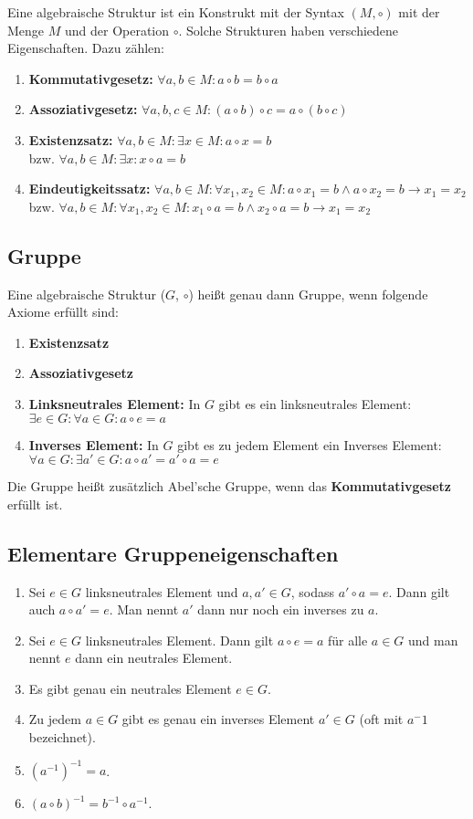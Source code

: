 Eine algebraische Struktur ist ein Konstrukt mit der Syntax $(M, \circ)$ mit der Menge $M$ und der Operation $\circ$.
Solche Strukturen haben verschiedene Eigenschaften.
Dazu zählen:
\begin{enumerate}
    \item \textbf{Kommutativgesetz:} $\forall a, b\in M:a\circ b=b\circ a$
    \item \textbf{Assoziativgesetz:} $\forall a, b, c\in M:(a\circ b)\circ c=a\circ (b\circ c)$
    \item \textbf{Existenzsatz:} $\forall a, b\in M: \exists x\in M: a\circ x=b$\\
    bzw. $\forall a, b\in M: \exists x: x\circ a=b$
    \item \textbf{Eindeutigkeitssatz:} $\forall a, b\in M:\forall x_1, x_2\in M : a\circ x_1 =b \wedge a\circ x_2=b\rightarrow x_1=x_2$\\
    bzw. $\forall a, b\in M:\forall x_1, x_2\in M : x_1\circ a =b \wedge x_2\circ a=b\rightarrow x_1=x_2$
\end{enumerate}
\subsection{Gruppe}
Eine algebraische Struktur ($G$, $\circ$) heißt genau dann Gruppe, wenn folgende Axiome erfüllt sind:
\begin{enumerate}
    \item \textbf{Existenzsatz}
    \item \textbf{Assoziativgesetz}
    \item \textbf{Linksneutrales Element:} In $G$ gibt es ein linksneutrales Element: $\exists e\in G: \forall a\in G: a\circ e = a$
    \item \textbf{Inverses Element:} In $G$ gibt es zu jedem Element ein Inverses Element: $\forall a\in G:\exists a'\in G: a\circ a'=a'\circ a=e$
\end{enumerate}
Die Gruppe heißt zusätzlich Abel'sche Gruppe, wenn das \textbf{Kommutativgesetz} erfüllt ist.
\subsection{Elementare Gruppeneigenschaften}\label{subsec:elementare-gruppeneigenschaften}
\begin{enumerate}
    \item Sei $e\in G$ linksneutrales Element und $a,a'\in G$, sodass $a'\circ a=e$.
    Dann gilt auch $a\circ a'=e$.
    Man nennt $a'$ dann nur noch ein inverses zu $a$.
    \item Sei $e\in G$ linksneutrales Element.
    Dann gilt $a\circ e=a$ für alle $a\in G$ und man nennt $e$ dann ein neutrales Element.
    \item Es gibt genau ein neutrales Element $e\in G$.
    \item Zu jedem $a\in G$ gibt es genau ein inverses Element $a'\in G$ (oft mit $a^-1$ bezeichnet).
    \item $(a^{-1})^{-1}=a$.
    \item $(a\circ b)^{-1}=b^{-1}\circ a^{-1}$.
\end{enumerate}

